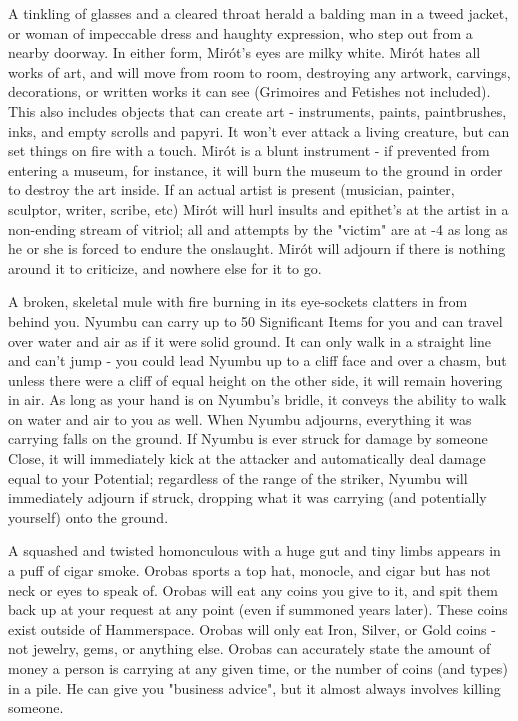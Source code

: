 {

A tinkling of glasses and a cleared throat herald a balding man in a tweed jacket, or woman of impeccable dress and haughty expression, who step out from a nearby doorway.  In either form, Mirót's eyes are milky white.  Mirót hates all works of art, and will move from room to room, destroying any artwork, carvings, decorations, or written works it can see (Grimoires and Fetishes not included).  This also includes objects that can create art - instruments, paints, paintbrushes, inks, and empty scrolls and papyri.  It won't ever attack a living creature, but can set things on fire with a touch.  Mirót is a blunt instrument - if prevented from entering a museum, for instance, it will burn the museum to the ground in order to destroy the art inside.  If an actual artist is present (musician, painter, sculptor, writer, scribe, etc) Mirót will hurl insults and epithet's at the artist in a non-ending stream of vitriol; all \RO and \RS attempts by the "victim" are at -4 as long as he or she is forced to endure the onslaught.  Mirót will adjourn if there is nothing around it to criticize, and nowhere else for it to go.



A broken, skeletal mule with fire burning in its eye-sockets clatters in from behind you.  Nyumbu can carry up to 50 Significant Items for you and can travel over water and air as if it were solid ground.  It can only walk in a straight line and can't jump - you could lead Nyumbu up to a cliff face and over a chasm, but unless there were a cliff of equal height on the other side, it will remain hovering in air.  As long as your hand is on Nyumbu's bridle, it conveys the ability to walk on water and air to you as well.  When Nyumbu adjourns, everything it was carrying falls on the ground.  If Nyumbu is ever struck for damage by someone Close, it will immediately kick at the attacker and automatically deal damage equal to your Potential; regardless of the range of the striker, Nyumbu will immediately adjourn if struck, dropping what it was carrying (and potentially yourself) onto the ground.


A squashed and twisted homonculous with a huge gut and tiny limbs appears in a puff of cigar smoke.  Orobas sports a top hat, monocle, and cigar but has not neck or eyes to speak of.  Orobas will eat any coins you give to it, and spit them back up at your request at any point (even if summoned years later).  These coins exist outside of Hammerspace.  Orobas will only eat Iron, Silver, or Gold coins - not jewelry, gems, or anything else.  Orobas can accurately state the amount of money a person is carrying at any given time, or the number of coins (and types) in a pile.  He can give you "business advice", but it almost always involves killing someone.


}
